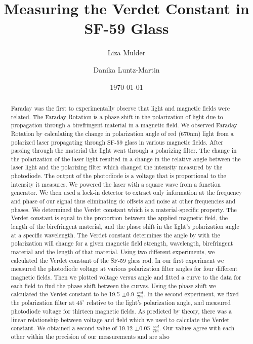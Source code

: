 \documentclass[prb,preprint]{revtex4-1}
\begin{document}

\title{Measuring the Verdet Constant in SF-59 Glass}


\author{Liza Mulder}


\author{Danika Luntz-Martin}


\date{\today}



\begin{abstract}

Faraday was the first to experimentally observe that light and magnetic fields were related. The Faraday Rotation is a phase shift in the polarization of light due to propagation through a birefringent material in a magnetic field. We observed Faraday Rotation by calculating the change in polarization angle of red (670nm) light from a polarized laser propagating through SF-59 glass in various magnetic fields. After passing through the material the light went through a polarizing filter. The change in the polarization of the laser light resulted in a change in the relative angle between the laser light and the polarizing filter which changed the intensity measured by the photodiode. The output of the photodiode is a voltage that is proportional to the intensity it measures. We powered the laser with a square wave from a function generator.  We then used a lock-in detector to extract only information at the frequency and phase of our signal thus eliminating dc offsets and noise at other frequencies and phases. We determined the Verdet constant which is a material-specific property. The Verdet constant is equal to the proportion between the applied magnetic field, the length of the birefringent material, and the phase shift in the light's polarization angle at a specific wavelength. The Verdet constant determines the angle by with the polarization will change for a given magnetic field strength, wavelength, birefringent material and the length of that material. Using two different experiments, we calculated the Verdet constant of the SF-59 glass rod. In our first experiment we measured the photodiode voltage at various polarization filter angles for four different magnetic fields. Then we plotted voltage versus angle and fitted a curve to the data for each field to find the phase shift between the curves. Using the phase shift we calculated the Verdet constant to be 19.5 $\pm$0.9 $\frac{rad}{Tm}$. In the second experiment, we fixed the polarization filter at $45^{\circ}$ relative to the light's polarization angle, and measured photodiode voltage for thirteen magnetic fields.  As predicted by theory, there was a linear relationship between voltage and field which we used to calculate the Verdet constant. We obtained a second value of 19.12 $\pm$0.05 $\frac{rad}{Tm}$. Our values agree with each other within the precision of our measurements and are also 
\end{abstract}
\end{document}
